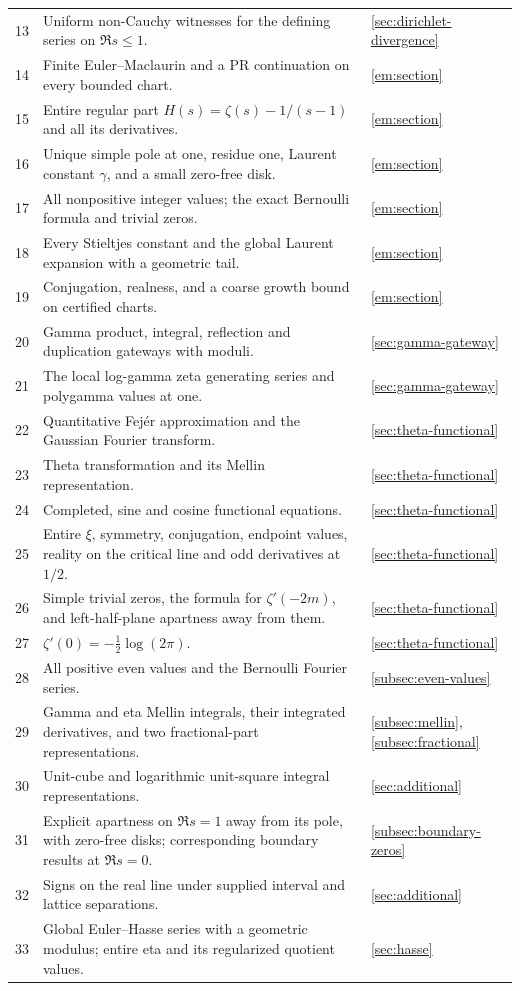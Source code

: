 \documentclass[11pt,letterpaper]{article}
\theoremstyle{definition}
\begin{document}
\begin{longtable}{p{}p{}p{}}
13 & Uniform non-Cauchy witnesses for the defining series on $\Re s\le1$. & \ref{sec:dirichlet-divergence}\\
14 & Finite Euler--Maclaurin and a PR continuation on every bounded chart. & \ref{em:section}\\
15 & Entire regular part $H(s)=\zeta(s)-1/(s-1)$ and all its derivatives. & \ref{em:section}\\
16 & Unique simple pole at one, residue one, Laurent constant $\gamma$, and a small zero-free disk. & \ref{em:section}\\
17 & All nonpositive integer values; the exact Bernoulli formula and trivial zeros. & \ref{em:section}\\
18 & Every Stieltjes constant and the global Laurent expansion with a geometric tail. & \ref{em:section}\\
19 & Conjugation, realness, and a coarse growth bound on certified charts. & \ref{em:section}\\
20 & Gamma product, integral, reflection and duplication gateways with moduli. & \ref{sec:gamma-gateway}\\
21 & The local log-gamma zeta generating series and polygamma values at one. & \ref{sec:gamma-gateway}\\
22 & Quantitative Fej\'er approximation and the Gaussian Fourier transform. & \ref{sec:theta-functional}\\
23 & Theta transformation and its Mellin representation. & \ref{sec:theta-functional}\\
24 & Completed, sine and cosine functional equations. & \ref{sec:theta-functional}\\
25 & Entire $\xi$, symmetry, conjugation, endpoint values, reality on the critical line and odd derivatives at $1/2$. & \ref{sec:theta-functional}\\
26 & Simple trivial zeros, the formula for $\zeta'(-2m)$, and left-half-plane apartness away from them. & \ref{sec:theta-functional}\\
27 & $\zeta'(0)=-\tfrac12\log(2\pi)$. & \ref{sec:theta-functional}\\
28 & All positive even values and the Bernoulli Fourier series. & \ref{subsec:even-values}\\
29 & Gamma and eta Mellin integrals, their integrated derivatives, and two fractional-part representations. & \ref{subsec:mellin}, \ref{subsec:fractional}\\
30 & Unit-cube and logarithmic unit-square integral representations. & \ref{sec:additional}\\
31 & Explicit apartness on $\Re s=1$ away from its pole, with zero-free disks; corresponding boundary results at $\Re s=0$. & \ref{subsec:boundary-zeros}\\
32 & Signs on the real line under supplied interval and lattice separations. & \ref{sec:additional}\\
33 & Global Euler--Hasse series with a geometric modulus; entire eta and its regularized quotient values. & \ref{sec:hasse}\\
\bottomrule
\end{longtable}
\end{document}
